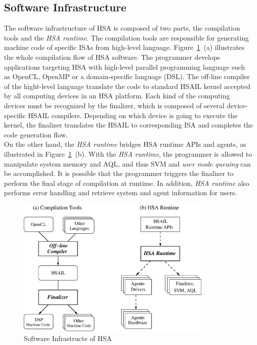         \subsection{Software Infrastructure}
        The software infrastructure of HSA is composed of two parts, the compilation tools and the \textit{HSA runtime}.   
        The compilation tools are responsible for generating machine code of specific ISAs from high-level language.
        Figure~\ref{fig:swinf}~(a) illustrates the whole compilation flow of HSA software.
        The programmer develops applications targeting HSA with high-level parallel programming language such as OpenCL, OpenMP or a domain-specific language (DSL).
        The off-line compiler of the hight-level language translate the code to standard HSAIL kernel accepted by all computing devices in an HSA platform.
        Each kind of the computing devices must be recognized by the finalizer, 
        which is composed of several device-specific HSAIL compilers.
        Depending on which device is going to execute the kernel, 
        the finalizer translates the HSAIL to corresponding ISA and completes the code generation flow.
        \\\indent
        On the other hand, the \textit{HSA runtime} bridges HSA runtime APIs and agents, as illustrated in Figure~\ref{fig:swinf}~(b).
        With the \textit{HSA runtime}, the programmer is allowed to manipulate system memory and AQL, 
        and thus SVM and \textit{user mode queuing} can be accomplished.
        It is possible that the programmer triggers the finalizer to perform the final stage of compilation at runtime.
        In addition, \textit{HSA runtime} also performs error handling and retrieve system and agent information for users.
        \vspace{\textfig}
        \begin{figure}[!ht] 
            \centering
            \includegraphics[width=0.85\textwidth]{./figs/swinf.eps}
            \caption{Software Infrastructe of HSA}
            \label{fig:swinf}
        \end{figure}

